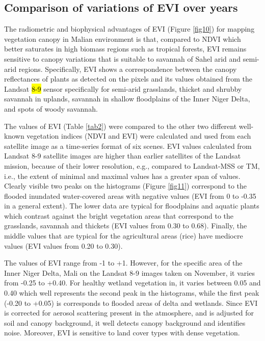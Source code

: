 \documentclass[12pt,a4paper,oneside]{article}
\def \newpar{\vspace{6pt}}
\begin{document}
\subsection*{Comparison of variations of EVI over years}

\newpar The radiometric and biophysical advantages of EVI (Figure \ref{fig10}) for mapping vegetation canopy in Malian environment is that, compared to NDVI which better saturates in high biomass regions such as tropical forests, EVI remains sensitive to canopy variations that is suitable to savannah of Sahel arid and semi-arid regions. Specifically, EVI shows a correspondence between the canopy reflectances of plants as detected on the pixels and its values obtained from the Landsat \hl{8-9} sensor specifically for semi-arid grasslands, thicket and shrubby savannah in uplands, savannah in shallow floodplains of the Inner Niger Delta, and spots of woody savannah. 

\newpar The values of EVI (Table \ref{tab2}) were compared to the other two different well-known vegetation indices (NDVI and EVI) were calculated and used from each satellite image as a time-series format of six scenes. EVI values calculated from Landsat 8-9 satellite images are higher than earlier satellites of the Landsat mission, because of their lower resolution, e.g., compared to Landsat-MSS or TM, i.e., the extent of minimal and maximal values has a greater span of values. Clearly visible two peaks on the histograms (Figure \ref{fig11}) correspond to the flooded inundated water-covered areas with negative values (EVI from 0 to -0.35 in a general extent). The lower data are typical for floodplains and aquatic plants which contrast against the bright vegetation areas that correspond to the grasslands, savannah and thickets (EVI values from 0.30 to 0.68). Finally, the middle values that are typical for the agricultural areas (rice) have mediocre values (EVI values from 0.20 to 0.30). 

\newpar The values of EVI range from -1 to +1. However, for the specific area of the Inner Niger Delta, Mali on the Landsat 8-9 images taken on November, it varies from -0.25 to +0.40. For healthy wetland vegetation in, it varies between 0.05 and 0.40 which well represents the second peak in the histograms, while the first peak (-0.20 to +0.05) is corresponds to  flooded areas of delta and wetlands. Since EVI is corrected for aerosol scattering present in the atmosphere, and is adjusted for soil and canopy background, it well detects canopy background and identifies noise. Moreover, EVI is sensitive to land cover types with dense vegetation.
\end{document}
